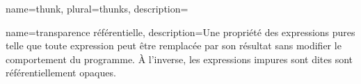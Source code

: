 {
	name=thunk,
	plural=thunks,
	description={}
}

 {
	name={transparence référentielle},
	description={Une propriété des expressions pures telle que toute expression peut être remplacée par son résultat sans modifier le comportement du programme. À l'inverse, les expressions impures sont dites sont référentiellement opaques.}
}
